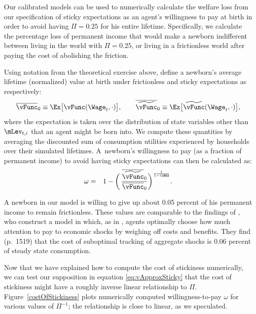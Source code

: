 \documentclass[titlepage]{\econtex}
\begin{document}
Our calibrated models can be used to numerically calculate the welfare loss from our specification of sticky expectations as an agent's willingness to pay at birth in order to avoid having $\Pi=0.25$ for his entire lifetime. %
 Specifically, we calculate the percentage loss of permanent income that would make a newborn indifferent between living in the world with $\Pi=0.25$, or living in a frictionless world after paying the cost of abolishing the friction.  %

Using notation from the theoretical exercise above, define a newborn's average lifetime (normalized) value at birth under frictionless and sticky expectations as respectively:
\begin{equation*}
\overline{\vFunc}_0 \equiv \Ex \big[ \vFunc(\Wage_t,\cdot)\big], \qquad \overline{\perc{\vFunc}}_0 \equiv \Ex \big[ \perc{\vFunc}(\Wage_t,\cdot)\big],
\end{equation*}
where the expectation is taken over the distribution of state variables other than $\mLev_{t,i}$ that an agent might be born into.  We compute these quantities by averaging the discounted sum of consumption utilities experienced by households over their simulated lifetimes.  A~newborn's willingness to pay (as a fraction of permanent income) to avoid having sticky expectations can then be calculated as:
\begin{eqnarray}\label{eq:WTP}
\omega & = & 1 - \bigg(\,\frac{\overline{\perc{\vFunc}}_0}{\overline{\vFunc}_0} \bigg)^{\frac{1}{1-\CRRA}}.
\end{eqnarray}

A newborn in our model is willing to give up about 0.05 percent of his permanent income to remain frictionless.  These values are comparable to the findings of \cite{mackWiedREStud15}, who construct a model in which, as in \cite{reis:inattentive}, agents optimally choose how much attention to pay to economic shocks by weighing off costs and benefits.  They find (p.\ 1519) that the cost of suboptimal tracking of aggregate shocks is 0.06 percent of steady state consumption. %

Now that we have explained how to compute the cost of stickiness numerically, we can test our supposition in equation \eqref{eq:vApproxSticky} that the cost of stickiness might have a roughly inverse linear relationship to $\Pi$.  Figure~\ref{costOfStickiness} plots numerically computed willingness-to-pay $\omega$ for various values of $\Pi^{-1}$; the relationship is close to linear, as we speculated.
\end{document}
